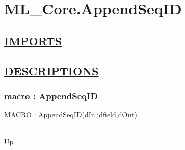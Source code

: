 \chapter*{ML\_Core.AppendSeqID}
\hypertarget{ML_Core.AppendSeqID}{}

\section*{\underline{IMPORTS}}

\section*{\underline{DESCRIPTIONS}}
\subsection*{macro : AppendSeqID}
\hypertarget{ecldoc:ml_core.appendseqid}{MACRO : AppendSeqID(dIn,idfield,dOut)} \\
\hyperlink{ecldoc:}{Up} \\
\par
